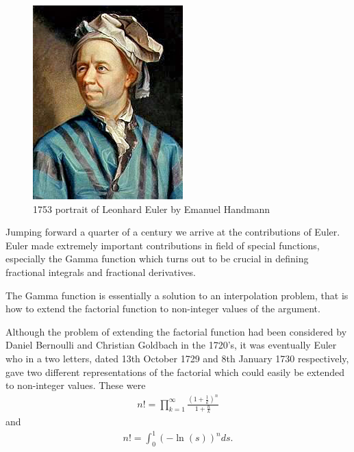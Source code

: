 \begin{figure}
    \includegraphics[scale=0.8]{images/Leonhard_Euler}
    \caption{1753 portrait of Leonhard Euler by Emanuel Handmann}
\end{figure}

Jumping forward a quarter of a century we arrive at the contributions of Euler. Euler made extremely important contributions in field of special functions, especially the Gamma function which turns out to be crucial in defining fractional integrals and fractional derivatives.

The Gamma function is essentially a solution to an interpolation problem, that is how to extend the factorial function to non-integer values of the argument. 



Although the problem of extending the factorial function had been considered by Daniel Bernoulli and Christian Goldbach in the 1720’s, it was eventually Euler who in a two letters, dated 13th October 1729 and 8th January 1730 respectively, gave two different representations of the factorial which could easily be extended to non-integer values. These were
\begin{align}
    \label{eq:euler_prod}
    n! = \prod_{k=1}^\infty \frac{\left(1+\frac{1}{k}\right)^n}{1 + \frac{n}{k}}
\end{align}
and
\begin{align}
    \label{eq:euler_log}
    n! = \int_0^1 (-\ln(s))^n ds.
\end{align}


